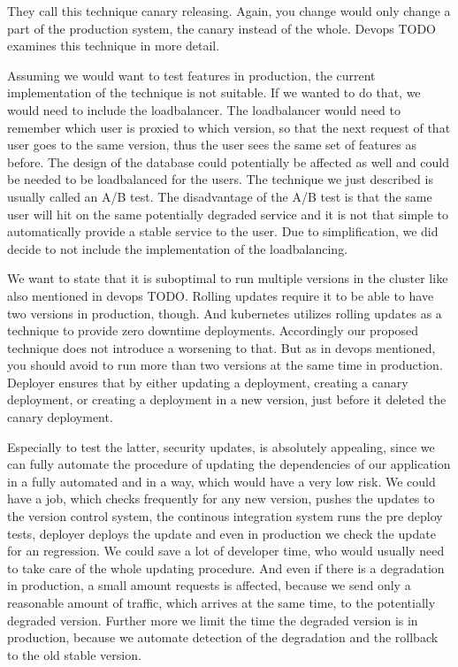 They call this technique canary releasing. Again, you change would only change a part of
the production system, the canary instead of the whole. Devops TODO examines this
technique in more detail.

Assuming we would want to test features in production, the current implementation of the
technique is not suitable. If we wanted to do that, we would need to include the
loadbalancer. The loadbalancer would need to remember which user is proxied to which
version, so that the next request of that user goes to the same version, thus the user
sees the same set of features as before. The design of the database could potentially be
affected as well and could be needed to be loadbalanced for the users. The technique we
just described is usually called an A/B test. The disadvantage of the A/B test is that the
same user will hit on the same potentially degraded service and it is not that simple to
automatically provide a stable service to the user. Due to simplification, we did decide
to not include the implementation of the loadbalancing.

We want to state that it is suboptimal to run multiple versions in the cluster like also
mentioned in devops TODO. Rolling updates require it to be able to have two versions in
production, though. And kubernetes utilizes rolling updates as a technique to provide zero
downtime deployments. Accordingly our proposed technique does not introduce a worsening to
that. But as in devops mentioned, you should avoid to run more than two versions at the
same time in production. Deployer ensures that by either updating a deployment, creating a
canary deployment, or creating a deployment in a new version, just before it deleted the
canary deployment.

Especially to test the latter, security updates, is absolutely appealing, since we can
fully automate the procedure of updating the dependencies of our application in a fully
automated and in a way, which would have a very low risk. We could have a job, which
checks frequently for any new version, pushes the updates to the version control system,
the continous integration system runs the pre deploy tests, deployer deploys the update
and even in production we check the update for an regression. We could save a lot of
developer time, who would usually need to take care of the whole updating procedure. And
even if there is a degradation in production, a small amount requests is affected, because
we send only a reasonable amount of traffic, which arrives at the same time, to the
potentially degraded version. Further more we limit the time the degraded version is in
production, because we automate detection of the degradation and the rollback to the old
stable version.

